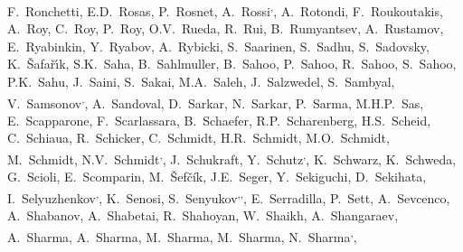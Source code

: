 \begin{flushleft}
F.~Ronchetti\And, 
E.D.~Rosas\And, 
P.~Rosnet\And, 
A.~Rossi\textsuperscript{,}\And, 
A.~Rotondi\And, 
F.~Roukoutakis\And, 
A.~Roy\And, 
C.~Roy\And, 
P.~Roy\And, 
O.V.~Rueda\And, 
R.~Rui\And, 
B.~Rumyantsev\And, 
A.~Rustamov\And, 
E.~Ryabinkin\And, 
Y.~Ryabov\And, 
A.~Rybicki\And, 
S.~Saarinen\And, 
S.~Sadhu\And, 
S.~Sadovsky\And, 
K.~\v{S}afa\v{r}\'{\i}k\And, 
S.K.~Saha\And, 
B.~Sahlmuller\And, 
B.~Sahoo\And, 
P.~Sahoo\And, 
R.~Sahoo\And, 
S.~Sahoo\And, 
P.K.~Sahu\And, 
J.~Saini\And, 
S.~Sakai\And, 
M.A.~Saleh\And, 
J.~Salzwedel\And, 
S.~Sambyal\And, 
V.~Samsonov\textsuperscript{,}\And, 
A.~Sandoval\And, 
D.~Sarkar\And, 
N.~Sarkar\And, 
P.~Sarma\And, 
M.H.P.~Sas\And, 
E.~Scapparone\And, 
F.~Scarlassara\And, 
B.~Schaefer\And, 
R.P.~Scharenberg\And, 
H.S.~Scheid\And, 
C.~Schiaua\And, 
R.~Schicker\And, 
C.~Schmidt\And, 
H.R.~Schmidt\And, 
M.O.~Schmidt\And, 
M.~Schmidt\And, 
N.V.~Schmidt\textsuperscript{,}\And, 
J.~Schukraft\And, 
Y.~Schutz\textsuperscript{,}\And, 
K.~Schwarz\And, 
K.~Schweda\And, 
G.~Scioli\And, 
E.~Scomparin\And, 
M.~\v{S}ef\v{c}\'ik\And, 
J.E.~Seger\And, 
Y.~Sekiguchi\And, 
D.~Sekihata\And, 
I.~Selyuzhenkov\textsuperscript{,}\And, 
K.~Senosi\And, 
S.~Senyukov\textsuperscript{,}\textsuperscript{,}\And, 
E.~Serradilla\And, 
P.~Sett\And, 
A.~Sevcenco\And, 
A.~Shabanov\And, 
A.~Shabetai\And, 
R.~Shahoyan\And, 
W.~Shaikh\And, 
A.~Shangaraev\And, 
A.~Sharma\And, 
A.~Sharma\And, 
M.~Sharma\And, 
M.~Sharma\And, 
N.~Sharma\textsuperscript{,}\And, 

\end{flushleft}
